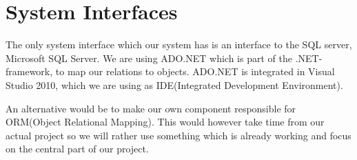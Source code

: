 \section{System Interfaces}
\label{sec:system_interfaces}
The only system interface which our system has is an interface to the SQL server, Microsoft SQL Server.
We are using ADO.NET which is part of the .NET-framework, to map our relations to objects.\cite{ado10}
ADO.NET is integrated in Visual Studio 2010, which we are using as IDE(Integrated Development Environment).

An alternative would be to make our own component responsible for ORM(Object Relational Mapping).
This would however take time from our actual project so we will rather use something which is already working and focus on the central part of our project.